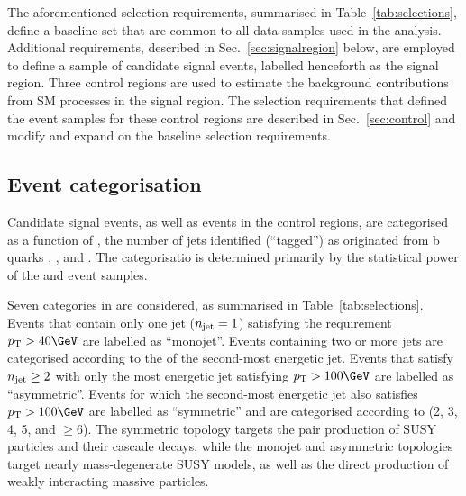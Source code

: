 The aforementioned selection requirements, summarised in
Table~\ref{tab:selections}, define a baseline set that are common to
all data samples used in the analysis. Additional requirements,
described in Sec.~\ref{sec:signalregion} below, are employed to define
a sample of candidate signal events, labelled henceforth as the signal
region. Three control regions are used to estimate the background
contributions from SM processes in the signal region. The selection
requirements that defined the event samples for these control regions
are described in Sec.~\ref{sec:control} and modify and expand on the
baseline selection requirements.

\subsection{Event categorisation}
\label{sec:categorisation}

Candidate signal events, as well as events in the control regions, are
categorised as a function of \njet, the number of jets identified
(``tagged'') as originated from b quarks \nb, \scalht, and \mht. The
categorisatio is determined primarily by the statistical power of the
\mj and \mmj event samples.

Seven categories in \njet are considered, as summarised in
Table~\ref{tab:selections}. Events that contain only one jet ($n_{\mathrm{jet}} =
1$) satisfying the requirement $\Pt > 40\GeV$ are labelled as
``monojet''. Events containing two or more jets are categorised
according to the \Pt of the second-most energetic jet. Events that
satisfy $n_{\mathrm{jet}} \geq 2$ with only the most energetic jet satisfying
$\Pt > 100\GeV$ are labelled as ``asymmetric''. Events for which the
second-most energetic jet also satisfies $\Pt > 100\GeV$ are labelled
as ``symmetric'' and are categorised according to \njet (2, 3, 4, 5,
and $\geq$6). The symmetric topology targets the pair production of
SUSY particles and their cascade decays, while the monojet and
asymmetric topologies target nearly mass-degenerate SUSY models, as
well as the direct production of weakly interacting massive particles.

